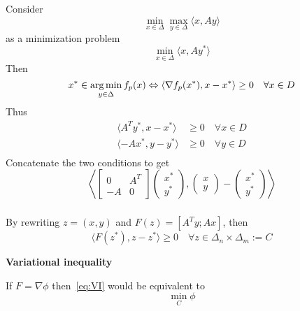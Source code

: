 \documentclass{beamer}
\begin{document}
\begin{frame}
  \frametitle{}
  Consider
  \begin{equation}
      \min_{x \in \Delta} \max_{y \in \Delta} \langle x, Ay \rangle
  \end{equation}
  as a minimization problem
  \begin{equation}
      \min_{x \in \Delta} \langle x, A y^* \rangle
  \end{equation}
  Then
  \begin{equation}
    x^* \in \operatorname*{arg\,min}_{y \in \Delta} f_p(x)  \Leftrightarrow \langle \nabla f_p(x^*), x-x^* \rangle \ge 0 \quad \forall x \in D
  \end{equation}
  Thus
  \begin{equation}
    \begin{aligned}
      \langle A^T y^*, x-x^* \rangle &\ge 0 \quad \forall  x \in D \\
      \langle -A x^*, y-y^* \rangle &\ge 0 \quad \forall  y \in D \\
    \end{aligned}
  \end{equation}
  Concatenate the two conditions to get
  \begin{equation}
  \left\langle \begin{bmatrix}
      0 & A^T \\
      -A & 0
    \end{bmatrix}
    \left(\begin{array}{c}
      x^*\\ y^*
    \end{array}  \right),
    \left(\begin{array}{c}
      x \\ y
    \end{array}  \right)
    -
    \left(\begin{array}{c}
      x^* \\
      y^*
    \end{array} \right)
 \right\rangle
  \end{equation}

\end{frame}

\begin{frame}
  \frametitle{}
  By rewriting $z=(x,y)$ and $F(z) = [A^T y; Ax]$, then
  \begin{equation}\tag{VI}
    \label{eq:VI}
    \langle F(z^*), z-z^* \rangle \ge 0 \quad \forall z \in \Delta_n \times \Delta_m := C
  \end{equation}
  \begin{center}
    \textbf{Variational inequality}
  \end{center}

  If $F = \nabla \phi$ then~\eqref{eq:VI} would be equivalent to
  \begin{equation}
    \min_C \phi
  \end{equation}


\end{frame}
\end{document}

